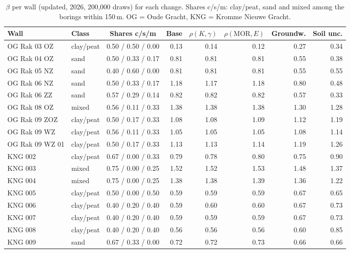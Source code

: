 \begin{table}[htbp]
\centering
\small
\caption{$\beta$ per wall (updated, 2026, 200{,}000 draws) for each change.
Shares c/s/m: clay/peat, sand and mixed among the borings within 150\,m.
OG = Oude Gracht, KNG = Kromme Nieuwe Gracht.}
\label{tab:sens-walls}
\setlength{\tabcolsep}{4pt}
\begin{tabular}{@{}l l c r r r r r@{}}
\toprule
Wall & Class & Shares c/s/m & Base & $\rho(K,\gamma)$ & $\rho(\text{MOR},E)$ & Groundw. & Soil unc. \\
\midrule
OG Rak 03 OZ & clay/peat & 0.50 / 0.50 / 0.00 & 0.13 & 0.14 & 0.12 & 0.27 & 0.34 \\
OG Rak 04 OZ & sand & 0.50 / 0.33 / 0.17 & 0.81 & 0.81 & 0.81 & 0.55 & 0.38 \\
OG Rak 05 NZ & sand & 0.40 / 0.60 / 0.00 & 0.81 & 0.81 & 0.81 & 0.55 & 0.55 \\
OG Rak 06 NZ & sand & 0.50 / 0.33 / 0.17 & 1.18 & 1.17 & 1.18 & 0.80 & 0.48 \\
OG Rak 06 ZZ & sand & 0.57 / 0.29 / 0.14 & 0.82 & 0.82 & 0.82 & 0.57 & 0.33 \\
OG Rak 08 OZ & mixed & 0.56 / 0.11 / 0.33 & 1.38 & 1.38 & 1.38 & 1.30 & 1.28 \\
OG Rak 09 ZOZ & clay/peat & 0.50 / 0.17 / 0.33 & 1.08 & 1.08 & 1.09 & 1.12 & 1.19 \\
OG Rak 09 WZ & clay/peat & 0.56 / 0.11 / 0.33 & 1.05 & 1.05 & 1.05 & 1.08 & 1.14 \\
OG Rak 09 WZ 01 & clay/peat & 0.50 / 0.17 / 0.33 & 1.13 & 1.13 & 1.14 & 1.19 & 1.26 \\
KNG 002 & clay/peat & 0.67 / 0.00 / 0.33 & 0.79 & 0.78 & 0.80 & 0.75 & 0.90 \\
KNG 003 & mixed & 0.75 / 0.00 / 0.25 & 1.52 & 1.52 & 1.53 & 1.48 & 1.37 \\
KNG 004 & mixed & 0.75 / 0.00 / 0.25 & 1.38 & 1.38 & 1.39 & 1.36 & 1.22 \\
KNG 005 & clay/peat & 0.50 / 0.00 / 0.50 & 0.59 & 0.59 & 0.59 & 0.67 & 0.65 \\
KNG 006 & clay/peat & 0.40 / 0.20 / 0.40 & 0.59 & 0.60 & 0.60 & 0.67 & 0.73 \\
KNG 007 & clay/peat & 0.40 / 0.20 / 0.40 & 0.59 & 0.59 & 0.59 & 0.67 & 0.73 \\
KNG 008 & clay/peat & 0.40 / 0.20 / 0.40 & 0.56 & 0.56 & 0.56 & 0.60 & 0.85 \\
KNG 009 & sand & 0.67 / 0.33 / 0.00 & 0.72 & 0.72 & 0.73 & 0.66 & 0.66 \\
\bottomrule
\end{tabular}
\end{table}

